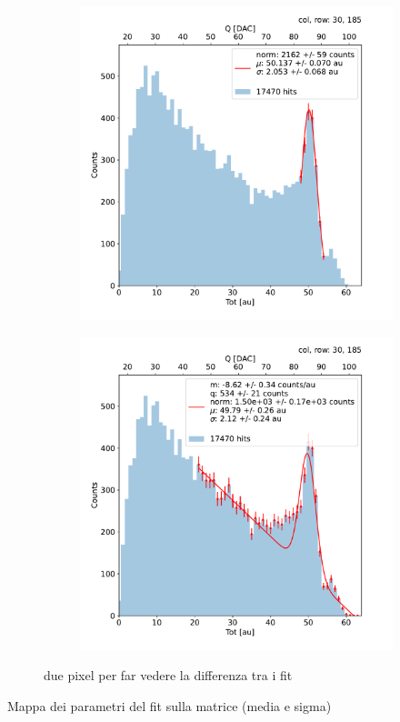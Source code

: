         \begin{figure}[h!]
            \begin{subfigure}{.5\textwidth}
            \centering
            \includegraphics[width=.99\linewidth]{figures/charaterization/fit_gauss_r185.pdf}
            \label{fig:}
            \end{subfigure}
            \begin{subfigure}{.5\textwidth}
            \centering
            \includegraphics[width=.99\linewidth]{figures/charaterization/fit_line_gauss_r185.pdf}
            \label{fig:}
            \end{subfigure}
            \caption{due pixel per far vedere la differenza tra i fit}
        \end{figure}    
         Mappa dei parametri del fit sulla matrice (media e sigma)
        
